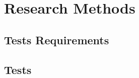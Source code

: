 \chapter{Research Methods}\label{chapter:researchmethods}


\section{Tests Requirements}

\section{Tests}
\
